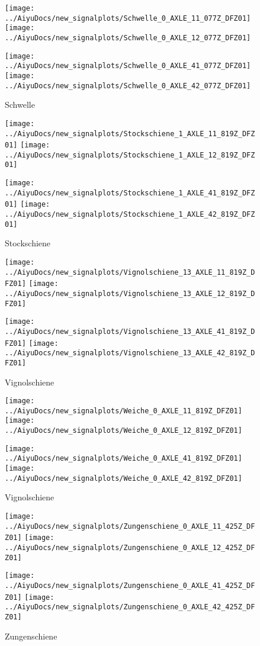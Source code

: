 \begin{figure}[H]
	\centering
	\texttt{[image: ../AiyuDocs/new\_signalplots/Schwelle\_0\_AXLE\_11\_077Z\_DFZ01]}
	\texttt{[image: ../AiyuDocs/new\_signalplots/Schwelle\_0\_AXLE\_12\_077Z\_DFZ01]}
	
	\texttt{[image: ../AiyuDocs/new\_signalplots/Schwelle\_0\_AXLE\_41\_077Z\_DFZ01]}
	\texttt{[image: ../AiyuDocs/new\_signalplots/Schwelle\_0\_AXLE\_42\_077Z\_DFZ01]}
	\caption{Schwelle}
\end{figure}

\begin{figure}[H]
	\centering
	\texttt{[image: ../AiyuDocs/new\_signalplots/Stockschiene\_1\_AXLE\_11\_819Z\_DFZ01]}
	\texttt{[image: ../AiyuDocs/new\_signalplots/Stockschiene\_1\_AXLE\_12\_819Z\_DFZ01]}
	
	\texttt{[image: ../AiyuDocs/new\_signalplots/Stockschiene\_1\_AXLE\_41\_819Z\_DFZ01]}
	\texttt{[image: ../AiyuDocs/new\_signalplots/Stockschiene\_1\_AXLE\_42\_819Z\_DFZ01]}
	\caption{Stockschiene}
\end{figure}

\begin{figure}[H]
	\centering
	\texttt{[image: ../AiyuDocs/new\_signalplots/Vignolschiene\_13\_AXLE\_11\_819Z\_DFZ01]}
	\texttt{[image: ../AiyuDocs/new\_signalplots/Vignolschiene\_13\_AXLE\_12\_819Z\_DFZ01]}
	
	\texttt{[image: ../AiyuDocs/new\_signalplots/Vignolschiene\_13\_AXLE\_41\_819Z\_DFZ01]}
	\texttt{[image: ../AiyuDocs/new\_signalplots/Vignolschiene\_13\_AXLE\_42\_819Z\_DFZ01]}
	\caption{Vignolschiene}
\end{figure}

\begin{figure}[H]
	\centering
	\texttt{[image: ../AiyuDocs/new\_signalplots/Weiche\_0\_AXLE\_11\_819Z\_DFZ01]}
	\texttt{[image: ../AiyuDocs/new\_signalplots/Weiche\_0\_AXLE\_12\_819Z\_DFZ01]}
	
	\texttt{[image: ../AiyuDocs/new\_signalplots/Weiche\_0\_AXLE\_41\_819Z\_DFZ01]}
	\texttt{[image: ../AiyuDocs/new\_signalplots/Weiche\_0\_AXLE\_42\_819Z\_DFZ01]}
	\caption{Vignolschiene}
\end{figure}

\begin{figure}[H]
	\centering
	\texttt{[image: ../AiyuDocs/new\_signalplots/Zungenschiene\_0\_AXLE\_11\_425Z\_DFZ01]}
	\texttt{[image: ../AiyuDocs/new\_signalplots/Zungenschiene\_0\_AXLE\_12\_425Z\_DFZ01]}
	
	\texttt{[image: ../AiyuDocs/new\_signalplots/Zungenschiene\_0\_AXLE\_41\_425Z\_DFZ01]}
	\texttt{[image: ../AiyuDocs/new\_signalplots/Zungenschiene\_0\_AXLE\_42\_425Z\_DFZ01]}
	\caption{Zungenschiene}
\end{figure}

